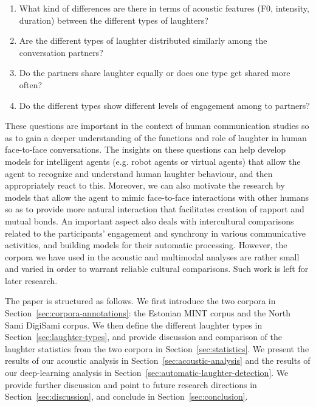 \documentclass[10pt,journal,compsoc]{IEEEtran}
\begin{document}
\begin{enumerate}
\item What kind of differences are there in terms of acoustic features (F0, intensity, duration) between the different types of laughters?
\item Are the different types of laughter distributed similarly among the conversation partners?
\item Do the partners share laughter equally or does one type get shared more often?
\item Do the different types show different levels of engagement among to partners?
\end{enumerate}

These questions are important in the context of human communication studies so as to gain a deeper understanding of the functions and role of laughter in human face-to-face conversations. The insights on these questions can help develop models for intelligent agents (e.g. robot agents or virtual agents) that allow the agent to recognize and understand human laughter behaviour, and then appropriately react to this. Moreover, we can also motivate the research by models that allow the agent to mimic face-to-face interactions with other humans so as to provide more natural interaction that facilitates creation of rapport and mutual bonds.
An important aspect also deals with intercultural comparisons related to the participants' engagement and synchrony in various communicative activities, and building models for their automatic processing. However, the corpora we have used in the acoustic and multimodal analyses are rather small and varied in order to warrant reliable cultural comparisons. Such work is left for later research.

The paper is structured as follows.
We first introduce the two corpora in Section~\ref{sec:corpora-annotations}:
the Estonian MINT corpus and the North Sami DigiSami corpus.
We then define the different laughter types in Section~\ref{sec:laughter-types},
and provide discussion and comparison of the laughter statistics from the two corpora
in Section~\ref{sec:statistics}.
We present the results of our acoustic analysis in Section~\ref{sec:acoustic-analysis}
and the results of our deep-learning analysis in Section~\ref{sec:automatic-laughter-detection}.
We provide further discussion and point to future research directions in Section~\ref{sec:discussion},
and conclude in Section~\ref{sec:conclusion}.
\end{document}
